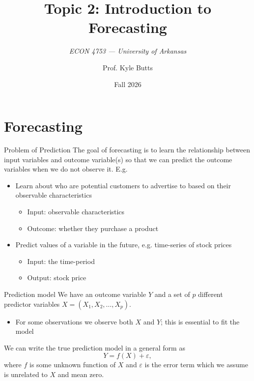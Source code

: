 \documentclass[aspectratio=169,t,11pt,table]{beamer}
\title{Topic 2: Introduction to Forecasting}
\subtitle{\it  ECON 4753 — University of Arkansas}
\date{Fall 2026}
\author{Prof. Kyle Butts}
\begin{document}
\begin{frame}
\maketitle

\end{frame}


\section{Forecasting}

\begin{frame}{Problem of Prediction}
  The goal of forecasting is to learn the relationship between \alert{input variables} and \alert{outcome variable(s)} so that we can \alert{predict} the outcome variables when we do not observe it. 
  \pause E.g.
  \begin{itemize}
    \item Learn about who are potential customers to advertise to based on their observable characteristics
    \begin{itemize}
      \item Input: observable characteristics
      \item Outcome: whether they purchase a product
    \end{itemize}
    
    \pause
    \item Predict values of a variable in the future, e.g. \alert{time-series} of stock prices
    \begin{itemize}
      \item Input: the time-period
      \item Output: stock price
    \end{itemize}
  \end{itemize}  
\end{frame}

\begin{frame}{Prediction model}
  We have an outcome variable $Y$ and a set of $p$ different predictor variables $X = (X_1, X_2, \dots, X_p)$. 
  \begin{itemize}
    \item For some observations we observe both $X$ and $Y$; this is essential to \alert{fit} the model
  \end{itemize}

  \bigskip
  We can write the true prediction model in a general form as
  $$
    Y = f(X) + \varepsilon,
  $$
  where $f$ is some unknown function of $X$ and $\varepsilon$ is the \alert{error term} which we assume is unrelated to $X$ and mean zero.
\end{frame}
\end{document}
